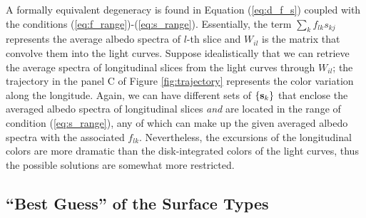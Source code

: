 \documentclass[iop,numberedappendix,apj,]{emulateapj}
\begin{document}
A formally equivalent degeneracy is found in Equation (\ref{eq:d_f_s}) coupled with the conditions (\ref{eq:f_range})-(\ref{eq:s_range}). 
Essentially, the term $\sum _k f_{lk} s_{kj}$ represents the average albedo spectra of $l$-th slice and $W_{il}$ is the matrix that convolve them into the light curves. 
Suppose idealistically that we can retrieve the average spectra of longitudinal slices from the light curves through $W_{il}$; the trajectory in the panel C of Figure \ref{fig:trajectory} represents the color variation along the longitude.  
Again, we can have different sets of $\{ {\bf s}_k \}$ that enclose the averaged albedo spectra of longitudinal slices {\it and} are located in the range of condition (\ref{eq:s_range}), any of which can make up the given averaged albedo spectra with the associated $f_{lk}$. 
Nevertheless, the excursions of the longitudinal colors are more dramatic than the disk-integrated colors of the light curves, thus the possible solutions are somewhat more restricted. 


\subsection{``Best Guess'' of the Surface Types}
\label{ss:guess}
\end{document}

